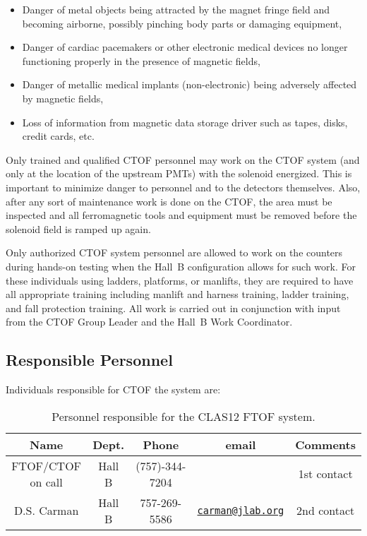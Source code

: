 \begin{itemize}
\item Danger of metal objects being attracted by the magnet fringe field and becoming airborne, 
possibly pinching body parts or damaging equipment,
\item Danger of cardiac pacemakers or other electronic medical devices no longer functioning 
properly in the presence of magnetic fields,
\item Danger of metallic medical implants (non-electronic) being adversely affected by magnetic 
fields,
\item Loss of information from magnetic data storage driver such as tapes, disks, credit cards, 
etc.
\end{itemize}

Only trained and qualified CTOF personnel may work on the CTOF system (and only at the 
location of the upstream PMTs) with the solenoid energized. This is important to minimize 
danger to personnel and to the detectors themselves. Also, after any sort of maintenance 
work is done on the CTOF, the area must be inspected and all ferromagnetic tools and 
equipment must be removed before the solenoid field is ramped up again.

Only authorized CTOF system personnel are allowed to work on the counters during hands-on
testing when the Hall~B configuration allows for such work. For these individuals using 
ladders, platforms, or manlifts, they are required to have all appropriate training 
including manlift and harness training, ladder training, and fall protection training. All 
work is carried out in conjunction with input from the CTOF Group Leader and the Hall~B Work 
Coordinator.

\subsection{Responsible Personnel}

Individuals responsible for CTOF the system are:

\begin{table}[!htb]
\centering
\begin{tabular}{|c|c|c|c|c|} \hline
Name              & Dept.  & Phone          & email & Comments \\ \hline
FTOF/CTOF on call & Hall B & (757)-344-7204 &       & 1st contact \\ \hline
D.S. Carman       & Hall B & 757-269-5586          & \href{mailto:carman@jlab.org}{\nolinkurl{carman@jlab.org}} & 2nd contact \\ \hline
\end{tabular}
\caption{Personnel responsible for the CLAS12 FTOF system.} 
\label{tb:ftof}
\end{table}

\vfil
\eject
